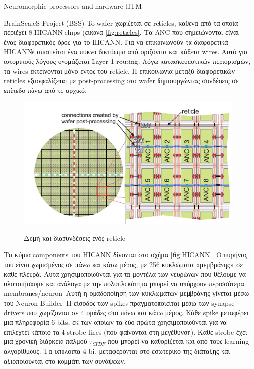\documentclass[a4paper,11pt]{article}
\begin{document}
\begin{section}{Neuromorphic processors and hardware HTM}
\begin{subsection}{BrainScaleS Project (BSS)}
    To wafer χωρίζεται σε reticles, καθένα από τα οποία περιέχει 8 HICANN chips (εικόνα \eqref{fig:reticles}. Τα ANC που σημειώνονται είναι ένας διαφορετικός όρος για το HICANN. Για να επικοινωνούν τα διαφορετικά HICANNs απαιτείται ένα πυκνό δικτύωμα από οριζόντια και κάθετα wires. Αυτό για ιστορικούς λόγους ονομάζεται Layer 1 routing. Λόγω κατασκευαστικών περιορισμών, τα wires εκτείνονται μόνο εντός του reticle. Η επικοινωνία μεταξύ διαφορετικών reticles εξασφαλίζεται με post-processing στο wafer δημιουργώντας συνδέσεις σε επίπεδο πάνω από το αρχικό.\\
    \begin{figure}[H]
      \centering%
      {\includegraphics[width=0.5\columnwidth,clip=true]{pics/reticle.jpg}}
      \caption{Δομή και διασυνδέσεις ενός reticle} \label{fig:reticles}
    \end{figure}
    Τα κύρια components του HICANN δίνονται στο σχήμα \eqref{fig:HICANN}. Ο πυρήνας του είναι χωρισμένος σε πάνω και κάτω μέρος, με 256 κυκλώματα «μεμβράνης» σε κάθε πλευρά. Αυτά χρησιμοποιούνται για τα μοντέλα των νευρώνων που θέλουμε να υλοποιήσουμε και ανάλογα με την πολυπλοκότητα μπορεί να υπάρχουν περισσότερα membranes/neuron. Αυτή η ομαδοποίηση των κυκλωμάτων μεμβράνης γίνεται μέσω του Neuron Builder. Η είσοδος των spikes πραγματοποιείται μέσω των synapse drivers που χωρίζονται σε 4 ομάδες στο πάνω και κάτω μέρος. Κάθε spike μεταφέρει μια πληροφορία 6 bits, εκ των οποίων τα δύο πρώτα χρησιμοποιούνται για να επιλεχτεί κάποιο τα 4 strobe lines (που φαίνονται στη μεγέθυνση). Κάθε strobe έχει μια χρονική διάρκεια παλμού $\tau_{STDF}$ που μπορεί να καθορίζεται και από τους learning αλγορίθμους. Τα υπόλοιπα 4 bit μεταφέρονται στο εσωτερικό της διάταξης και αξιοποιούνται στο κομμάτι των συνάψεων.\\
    \begin{figure} [H]
      \centering%
      \begin{subfigure}{0.5\columnwidth}

\end{subfigure}
\end{figure}
\end{subsection}
\end{section}
\end{document}

